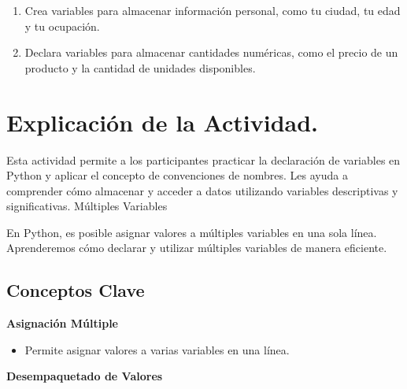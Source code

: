 \documentclass[
  a4paper,
  DIV=11,
  numbers=noendperiod,
  onepage,
  openany]{scrreprt}
\providecommand{\tightlist}{%
  \setlength{\itemsep}{0pt}\setlength{\parskip}{0pt}}\usepackage{longtable,booktabs,array}
\begin{document}
\begin{tcolorbox}[enhanced jigsaw, leftrule=.75mm, bottomtitle=1mm, title=\textcolor{quarto-callout-tip-color}{\faLightbulb}\hspace{0.5em}{Actividad Práctica}, colbacktitle=quarto-callout-tip-color!10!white, coltitle=black, bottomrule=.15mm, colframe=quarto-callout-tip-color-frame, titlerule=0mm, opacityback=0, rightrule=.15mm, toptitle=1mm, opacitybacktitle=0.6, arc=.35mm, breakable, colback=white, toprule=.15mm, left=2mm]

\begin{enumerate}
\def\labelenumi{\arabic{enumi}.}
\item
  Crea variables para almacenar información personal, como tu ciudad, tu
  edad y tu ocupación.
\item
  Declara variables para almacenar cantidades numéricas, como el precio
  de un producto y la cantidad de unidades disponibles.
\end{enumerate}

\end{tcolorbox}

\section{Explicación de la
Actividad.}\label{explicaciuxf3n-de-la-actividad.}

Esta actividad permite a los participantes practicar la declaración de
variables en Python y aplicar el concepto de convenciones de nombres.
Les ayuda a comprender cómo almacenar y acceder a datos utilizando
variables descriptivas y significativas. Múltiples Variables

En Python, es posible asignar valores a múltiples variables en una sola
línea. Aprenderemos cómo declarar y utilizar múltiples variables de
manera eficiente.

\subsection{Conceptos Clave}\label{conceptos-clave-5}

\textbf{Asignación Múltiple}

\begin{itemize}
\tightlist
\item
  Permite asignar valores a varias variables en una línea.
\end{itemize}

\textbf{Desempaquetado de Valores}
\end{document}
